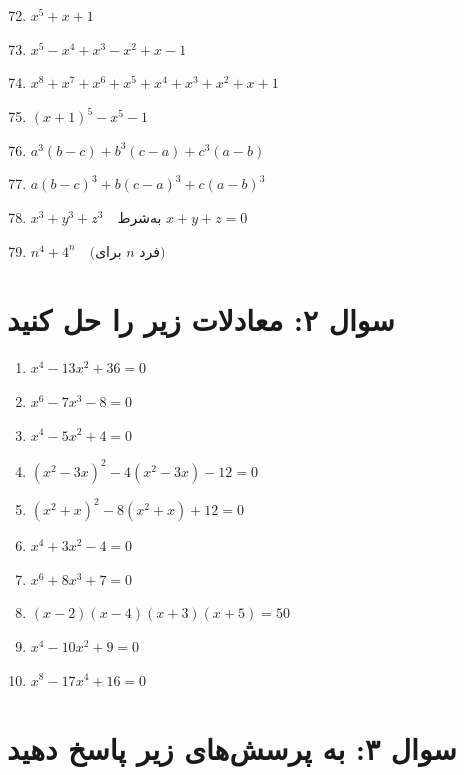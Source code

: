 \documentclass[12pt,a4paper]{article}
\begin{document}
\begin{enumerate}
\setcounter{enumi}{71}
\item $x^5 + x + 1$
\item $x^5 - x^4 + x^3 - x^2 + x - 1$
\item $x^8 + x^7 + x^6 + x^5 + x^4 + x^3 + x^2 + x + 1$
\item $(x+1)^5 - x^5 - 1$
\item $a^3(b-c) + b^3(c-a) + c^3(a-b)$
\item $a(b-c)^3 + b(c-a)^3 + c(a-b)^3$
\item $x^3 + y^3 + z^3 \quad \text{به‌شرط } x + y + z = 0$
\item $n^4 + 4^n \quad \text{(برای } n \text{ فرد)}$
\end{enumerate}

\vspace{1.5em}

\section*{سوال ۲: معادلات زیر را حل کنید}

\setcounter{enumi}{80}
\begin{enumerate}
\item $x^4 - 13x^2 + 36 = 0$
\item $x^6 - 7x^3 - 8 = 0$
\item $x^4 - 5x^2 + 4 = 0$
\item $(x^2 - 3x)^2 - 4(x^2 - 3x) - 12 = 0$
\item $(x^2 + x)^2 - 8(x^2 + x) + 12 = 0$
\item $x^4 + 3x^2 - 4 = 0$
\item $x^6 + 8x^3 + 7 = 0$
\item $(x-2)(x-4)(x+3)(x+5) = 50$
\item $x^4 - 10x^2 + 9 = 0$
\item $x^8 - 17x^4 + 16 = 0$
\end{enumerate}

\vspace{1.5em}

\section*{سوال ۳: به پرسش‌های زیر پاسخ دهید}
\end{document}
